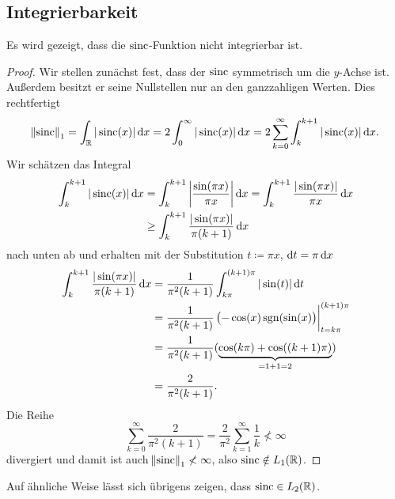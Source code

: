 \subsection{Integrierbarkeit}
Es wird gezeigt, dass die $ \operatorname{sinc} $-Funktion nicht integrierbar ist.
\begin{proof}
Wir stellen zunächst fest, dass der $ \operatorname{sinc} $ symmetrisch um die $ y $-Achse ist. Außerdem besitzt
er seine Nullstellen nur an den ganzzahligen Werten. Dies rechtfertigt
\[
    \norm{\sinc}_{1}
  = \int_{\R} |\sinc(x)| \dif x
  = 2 \int_{0}^{\infty} |\sinc(x)| \dif x
  = 2 \sum_{k = 0}^{\infty} \int_{k}^{k + 1} |\sinc(x)| \dif x.
\]
Wir schätzen das Integral
\begin{align*}
    \int_{k}^{k + 1} |\sinc(x)| \dif x
 &= \int_{k}^{k + 1} \left| \frac{\sin(\pi x)}{\pi x} \right|  \dif x
  = \int_{k}^{k + 1} \frac{|\sin(\pi x)|}{\pi x} \dif x \\
 &\geq \int_{k}^{k + 1} \frac{|\sin(\pi x)|}{\pi(k + 1)} \dif x
\end{align*}
nach unten ab und erhalten mit der Substitution $ t \coloneqq \pi x $, $ \dif t = \pi \dif x $
\begin{align*}
   \int_{k}^{k + 1} \frac{|\sin(\pi x)|}{\pi(k + 1)} \dif x
&= \frac{1}{\pi^{2}(k + 1)} \int_{k\pi}^{(k + 1)\pi} |\sin(t)| \dif t \\
&= \frac{1}{\pi^{2}(k + 1)} 
      \eval[3]{ \left( -\cos(x) \sgn(\sin(x) \right) }_{t = k\pi}^{(k + 1)\pi} \\
&= \frac{1}{\pi^{2}(k + 1)} (\underbrace{\cos(k\pi) + \cos((k + 1)\pi)}_{= 1 + 1 = 2})\\
&= \frac{2}{\pi^{2}(k + 1)}.
\end{align*}
Die Reihe
\[
    \sum_{k = 0}^{\infty} \frac{2}{\pi^{2}(k + 1)}
  = \frac{2}{\pi^{2}} \sum_{k = 1}^{\infty} \frac{1}{k}
  \nless \infty
\]
divergiert und damit ist auch $ \norm{\operatorname{sinc}}_{1} \nless \infty $, also $ \operatorname{sinc} \notin L_{1}(\mathbb{R}) $.
\end{proof}
Auf ähnliche Weise lässt sich übrigens zeigen, dass $ \operatorname{sinc} \in L_{2}(\mathbb{R}) $.

